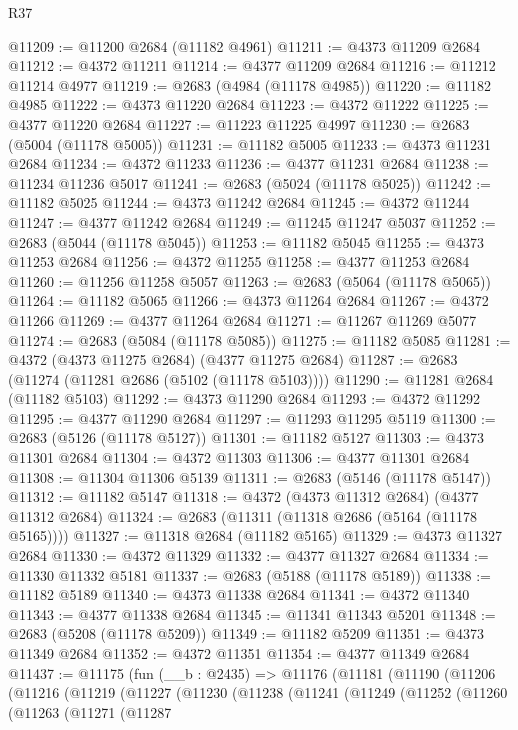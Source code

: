 \begin{lexlean}{R37}
\begin{coremodule}
@11209 := @11200 @2684 (@11182 @4961)
@11211 := @4373 @11209 @2684
@11212 := @4372 @11211
@11214 := @4377 @11209 @2684
@11216 := @11212 @11214 @4977
@11219 := @2683 (@4984 (@11178 @4985))
@11220 := @11182 @4985
@11222 := @4373 @11220 @2684
@11223 := @4372 @11222
@11225 := @4377 @11220 @2684
@11227 := @11223 @11225 @4997
@11230 := @2683 (@5004 (@11178 @5005))
@11231 := @11182 @5005
@11233 := @4373 @11231 @2684
@11234 := @4372 @11233
@11236 := @4377 @11231 @2684
@11238 := @11234 @11236 @5017
@11241 := @2683 (@5024 (@11178 @5025))
@11242 := @11182 @5025
@11244 := @4373 @11242 @2684
@11245 := @4372 @11244
@11247 := @4377 @11242 @2684
@11249 := @11245 @11247 @5037
@11252 := @2683 (@5044 (@11178 @5045))
@11253 := @11182 @5045
@11255 := @4373 @11253 @2684
@11256 := @4372 @11255
@11258 := @4377 @11253 @2684
@11260 := @11256 @11258 @5057
@11263 := @2683 (@5064 (@11178 @5065))
@11264 := @11182 @5065
@11266 := @4373 @11264 @2684
@11267 := @4372 @11266
@11269 := @4377 @11264 @2684
@11271 := @11267 @11269 @5077
@11274 := @2683 (@5084 (@11178 @5085))
@11275 := @11182 @5085
@11281 := @4372 (@4373 @11275 @2684) (@4377 @11275 @2684)
@11287 := @2683 (@11274 (@11281 @2686 (@5102 (@11178 @5103))))
@11290 := @11281 @2684 (@11182 @5103)
@11292 := @4373 @11290 @2684
@11293 := @4372 @11292
@11295 := @4377 @11290 @2684
@11297 := @11293 @11295 @5119
@11300 := @2683 (@5126 (@11178 @5127))
@11301 := @11182 @5127
@11303 := @4373 @11301 @2684
@11304 := @4372 @11303
@11306 := @4377 @11301 @2684
@11308 := @11304 @11306 @5139
@11311 := @2683 (@5146 (@11178 @5147))
@11312 := @11182 @5147
@11318 := @4372 (@4373 @11312 @2684) (@4377 @11312 @2684)
@11324 := @2683 (@11311 (@11318 @2686 (@5164 (@11178 @5165))))
@11327 := @11318 @2684 (@11182 @5165)
@11329 := @4373 @11327 @2684
@11330 := @4372 @11329
@11332 := @4377 @11327 @2684
@11334 := @11330 @11332 @5181
@11337 := @2683 (@5188 (@11178 @5189))
@11338 := @11182 @5189
@11340 := @4373 @11338 @2684
@11341 := @4372 @11340
@11343 := @4377 @11338 @2684
@11345 := @11341 @11343 @5201
@11348 := @2683 (@5208 (@11178 @5209))
@11349 := @11182 @5209
@11351 := @4373 @11349 @2684
@11352 := @4372 @11351
@11354 := @4377 @11349 @2684
@11437 := @11175
    (fun (__b : @2435) =>
    @11176
      (@11181
        (@11190
          (@11206
            (@11216
              (@11219
                (@11227
                  (@11230
                    (@11238
                      (@11241
                        (@11249
                          (@11252
                            (@11260
                              (@11263
                                (@11271
                                  (@11287

\end{coremodule}
\end{lexlean}
